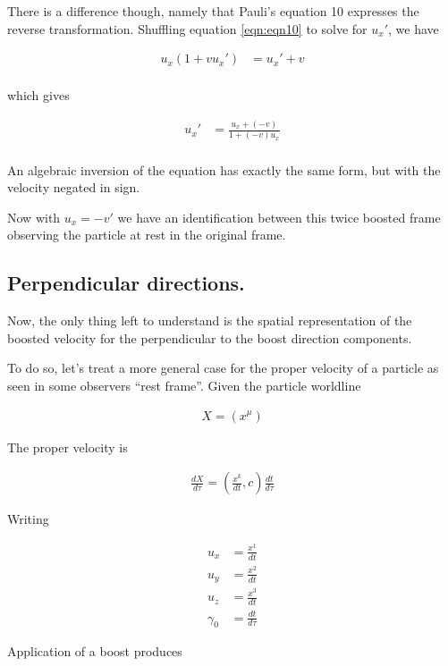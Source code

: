 \documentclass{article}
\begin{document}
There is a difference though, namely that Pauli's equation 10 expresses the reverse transformation.  Shuffling
equation \ref{eqn:eqn10} to solve for $u_x'$, we have

\begin{align*}
u_x ( 1 + v {u_x}') &= { {u_x}' + v  } \\
\end{align*}

which gives

\begin{align*}
u_x' &= \frac{ {u_x} + (-v)  }{ 1 + (-v) {u_x}} \\
\end{align*}

An algebraic inversion of the equation has exactly the same form, but with the velocity negated in sign.

Now with $u_x = -v'$ we have an identification between this twice boosted frame observing the particle at
rest in the original frame.

\subsection{Perpendicular directions. }

Now, the only thing left to understand is the spatial representation of the boosted velocity 
for the perpendicular to the boost direction components.

To do so, let's treat a more general case for the proper velocity of a particle as seen in some observers ``rest frame''.  Given the particle worldline

\begin{align*}
X = (x^\mu)
\end{align*}

The proper velocity is

\begin{align*}
\frac{dX}{d\tau} = \left(\frac{x^k}{dt}, c \right) \frac{dt}{d\tau}
\end{align*}

Writing

\begin{align*}
u_x &= \frac{x^1}{dt} \\
u_y &= \frac{x^2}{dt} \\
u_z &= \frac{x^3}{dt} \\
\gamma_0 &= \frac{dt}{d\tau}
\end{align*}

Application of a boost produces
\end{document}
